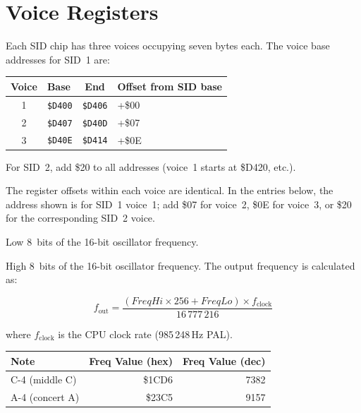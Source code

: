 \section{Voice Registers}
\label{sec:sid-voices}

Each SID chip has three voices occupying seven bytes each.  The voice base
addresses for SID~1 are:

\begin{center}
\small
\begin{tabular}{@{}clcl@{}}
\toprule
\textbf{Voice} & \textbf{Base} & \textbf{End} & \textbf{Offset from SID base} \\
\midrule
1 & \texttt{\$D400} & \texttt{\$D406} & +\$00 \\
2 & \texttt{\$D407} & \texttt{\$D40D} & +\$07 \\
3 & \texttt{\$D40E} & \texttt{\$D414} & +\$0E \\
\bottomrule
\end{tabular}
\end{center}

For SID~2, add \$20 to all addresses (voice~1 starts at \$D420, etc.).

The register offsets within each voice are identical.  In the entries below,
the address shown is for SID~1 voice~1; add \$07 for voice~2, \$0E for
voice~3, or \$20 for the corresponding SID~2 voice.




Low 8~bits of the 16-bit oscillator frequency.



High 8~bits of the 16-bit oscillator frequency.  The output frequency is
calculated as:

\[
  f_{\text{out}} = \frac{(\mathit{FreqHi} \times 256 + \mathit{FreqLo})
                         \times f_{\text{clock}}}{16\,777\,216}
\]

\noindent where $f_{\text{clock}}$ is the CPU clock rate (985\,248\,Hz PAL).

\begin{center}
\small
\begin{tabular}{@{}lrr@{}}
\toprule
\textbf{Note} & \textbf{Freq Value (hex)} & \textbf{Freq Value (dec)} \\
\midrule
C-4 (middle C) & \$1CD6 & 7382 \\
A-4 (concert A) & \$23C5 & 9157 \\
\bottomrule
\end{tabular}
\end{center}


